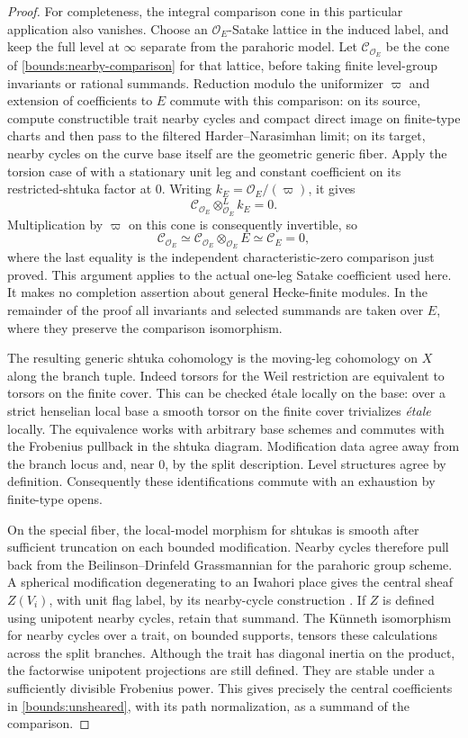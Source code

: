 \documentclass[11pt]{article}
\numberwithin{equation}{section}
\theoremstyle{definition}
\theoremstyle{remark}
\begin{document}
\begin{proof}
For completeness, the integral comparison cone in this particular
application also vanishes.  Choose an $\mathcal O_E$-Satake lattice in
the induced label, and keep the full level at $\infty$ separate from
the parahoric model.  Let $\mathcal C_{\mathcal O_E}$ be the cone of
\eqref{bounds:nearby-comparison} for that lattice, before taking
finite level-group invariants or rational summands.  Reduction modulo
the uniformizer $\varpi$ and extension of coefficients to $E$ commute
with this comparison: on its source, compute constructible trait
nearby cycles and compact direct image on finite-type charts and
then pass to the filtered Harder--Narasimhan limit; on its target,
nearby cycles on the curve base itself are the geometric generic
fiber.  Apply the torsion case of
\cite[Theorem~2.2]{Bounds:EteveXueNearby} with a stationary unit leg
and constant coefficient on its restricted-shtuka factor at $0$.
Writing $k_E=\mathcal O_E/(\varpi)$, it gives
\[
 \mathcal C_{\mathcal O_E}\otimes^L_{\mathcal O_E}k_E=0.
\]
Multiplication by $\varpi$ on this cone is consequently invertible,
so
\[
 \mathcal C_{\mathcal O_E}
   \simeq\mathcal C_{\mathcal O_E}\otimes_{\mathcal O_E}E
   \simeq\mathcal C_E=0,
\]
where the last equality is the independent characteristic-zero
comparison just proved.  This argument applies to the actual
one-leg Satake coefficient used here.  It makes no completion
assertion about general Hecke-finite modules.  In the remainder of
the proof all invariants and selected summands are taken over $E$,
where they preserve the comparison isomorphism.

The resulting generic shtuka cohomology is the moving-leg cohomology
on $X$ along the branch tuple.  Indeed torsors for the Weil restriction
are equivalent to torsors on the finite cover.  This can be checked
\'etale locally on the base: over a strict henselian local base a
smooth torsor on the finite cover trivializes \emph{\'etale} locally.
The equivalence works with arbitrary base schemes and commutes with
the Frobenius pullback in the shtuka diagram.  Modification data agree
away from the branch locus and, near $0$, by the split description.
Level structures agree by definition.  Consequently these
identifications commute with an exhaustion by finite-type opens.

On the special fiber, the local-model morphism for shtukas is smooth
after sufficient truncation on each bounded modification.  Nearby
cycles therefore pull back from the Beilinson--Drinfeld Grassmannian
for the parahoric group scheme.  A spherical modification degenerating
to an Iwahori place gives the central sheaf $Z(V_i)$, with unit flag
label, by its nearby-cycle construction
\cite[Theorem~2.3]{Parent}.  If $Z$ is
defined using unipotent nearby cycles, retain that summand.  The
K\"unneth isomorphism for nearby cycles over a trait, on bounded
supports, tensors these calculations across the split branches.
Although the trait has diagonal inertia on the product, the
factorwise unipotent projections are still defined.  They are stable
under a sufficiently divisible Frobenius power.  This gives precisely
the central coefficients in \eqref{bounds:unsheared}, with its path
normalization, as a summand of the comparison.


\end{proof}
\end{document}
